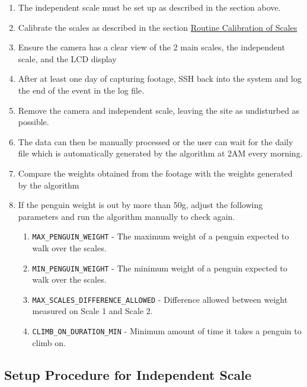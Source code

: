 \documentclass[
  letterpaper,
]{scrbook}
\begin{document}
\begin{enumerate}
\def\labelenumi{\arabic{enumi}.}
\setcounter{enumi}{2}
\item
  The independent scale must be set up as described in the section
  above.
\item
  Calibrate the scales as described in the section
  \hyperref[Routineux5cux2520Calibrationux5cux2520ofux5cux2520Scales]{Routine
  Calibration of Scales}
\item
  Ensure the camera has a clear view of the 2 main scales, the
  independent scale, and the LCD display
\item
  After at least one day of capturing footage, SSH back into the system
  and log the end of the event in the log file.
\item
  Remove the camera and independent scale, leaving the site as
  undisturbed as possible.
\item
  The data can then be manually processed or the user can wait for the
  daily file which is automatically generated by the algorithm at 2AM
  every morning.
\item
  Compare the weights obtained from the footage with the weights
  generated by the algorithm
\item
  If the penguin weight is out by more than 50g, adjust the following
  parameters and run the algorithm manually to check again.

  \begin{enumerate}
  \def\labelenumii{\alph{enumii}.}
  \item
    \texttt{MAX\_PENGUIN\_WEIGHT} - The maximum weight of a penguin
    expected to walk over the scales.
  \item
    \texttt{MIN\_PENGUIN\_WEIGHT} - The minimum weight of a penguin
    expected to walk over the scales.
  \item
    \texttt{MAX\_SCALES\_DIFFERENCE\_ALLOWED} - Difference allowed
    between weight measured on Scale 1 and Scale 2.
  \item
    \texttt{CLIMB\_ON\_DURATION\_MIN} - Minimum amount of time it takes
    a penguin to climb on.
  \end{enumerate}
\end{enumerate}

\subsection{Setup Procedure for Independent
Scale}\label{setup-procedure-for-independent-scale}
\end{document}
